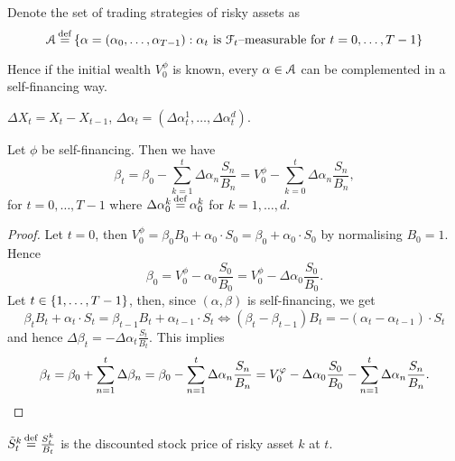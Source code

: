 \documentclass[12pt]{amsart}
\begin{document}
Denote the set of trading strategies of risky assets as \[
    \cA \defn \set{\alpha = (\alpha_0, \dots, \alpha_{T-1}) : \alpha_t \text{ is } \cF_t\text{--measurable for } t=0, \dots, T-1}
\]

Hence if the initial wealth \(V_0^\phi\) is known, every \(\alpha \in \cA\) can be complemented in a self-financing way.

\begin{remark}[Notation]
    \(\Delta X_t = X_t - X_{t-1}\), \(\Delta \alpha_t = (\Delta \alpha_t^1, \dots, \Delta \alpha_t^d)\).
\end{remark}

\begin{lemma}
    Let \(\phi\) be self-financing. Then we have \[
        \beta_t = \beta_0 - \sum_{k=1}^t \Delta \alpha_n \frac{S_n}{B_n} = V_0^\phi - \sum_{k=0}^t \Delta \alpha_n \frac{S_n}{B_n},
    \]
    for \(t=0, \dots, T-1\) where \(\Delta \alpha_0^k \defn \alpha_0^k\) for \(k=1, \dots, d\).
\end{lemma}
\begin{proof}
    Let \(t=0\), then \(V_0^\phi = \beta_0 B_0 + \alpha_0 \cdot S_0 = \beta_0 + \alpha_0 \cdot S_0\) by normalising \(B_0 = 1\). Hence \[
        \beta_0 = V_0^\phi - \alpha_0 \frac{S_0}{B_0} = V_0^\phi - \Delta \alpha_0 \frac{S_0}{B_0}.
    \]
    Let \(t \in \set{1, \dots, T-1}\), then, since \((\alpha, \beta)\) is self-financing, we get \[
        \beta_t B_t + \alpha_t \cdot S_t = \beta_{t-1} B_t + \alpha_{t-1} \cdot S_t \iff (\beta_t-\beta_{t-1}) B_t = -(\alpha_t - \alpha_{t-1}) \cdot S_t
    \]
    and hence \(\Delta \beta_t = - \Delta \alpha_t \frac{S_t}{B_t}\).
    This implies \[
        \beta_t = \beta_0 + \sum_{n=1}^t \Delta \beta_n = \beta_0 - \sum_{n=1}^t \Delta \alpha_n \frac{S_n}{B_n} = V_0^\phi - \Delta \alpha_0 \frac{S_0}{B_0} - \sum_{n=1}^t \Delta \alpha_n \frac{S_n}{B_n}.\qedhere
    \]
\end{proof}

\begin{definition}
    \(\tilde{S}_t^k \defn \frac{S_t^k}{B_t}\) is the discounted stock price of risky asset \(k\) at \(t\).
\end{definition}
\end{document}
